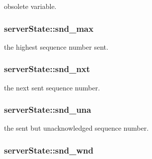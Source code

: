 obsolete variable. 

\hypertarget{structserverState_a40a01ae835807ebee67bcee468cec70a}{
\subsubsection[{snd\-\_\-max}]{ {\bf server\-State\-::snd\-\_\-max}}}\label{structserverState_a40a01ae835807ebee67bcee468cec70a}


the highest sequence number sent. 

\hypertarget{structserverState_ac22718f65dc3faefe5f0f14a34225890}{
\subsubsection[{snd\-\_\-nxt}]{ {\bf server\-State\-::snd\-\_\-nxt}}}\label{structserverState_ac22718f65dc3faefe5f0f14a34225890}


the next sent sequence number. 

\hypertarget{structserverState_a8ffed075ab5c35026735e9b84ec52a9f}{
\subsubsection[{snd\-\_\-una}]{ {\bf server\-State\-::snd\-\_\-una}}}\label{structserverState_a8ffed075ab5c35026735e9b84ec52a9f}


the sent but unacknowledged sequence number. 

\hypertarget{structserverState_a26d3e92a264e66f0309028bc1b4a0fdf}{
\subsubsection[{snd\-\_\-wnd}]{ {\bf server\-State\-::snd\-\_\-wnd}}}\label{structserverState_a26d3e92a264e66f0309028bc1b4a0fdf}


